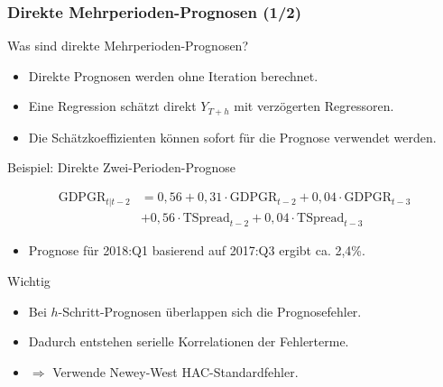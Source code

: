 \documentclass[10pt,aspectratio=169]{beamer}\usepackage[]{graphicx}\usepackage[]{xcolor}
\begin{document}
\begin{frame}
  \frametitle{Direkte Mehrperioden-Prognosen \hfill (1/2)}

  Was sind direkte Mehrperioden-Prognosen?
  
  \begin{itemize}
    \item Direkte Prognosen werden ohne Iteration berechnet.
    \item Eine Regression schätzt direkt $Y_{T+h}$ mit verzögerten Regressoren.
    \item Die Schätzkoeffizienten können sofort für die Prognose verwendet werden.
  \end{itemize}  

  Beispiel: Direkte Zwei-Perioden-Prognose
  
  \vspace{-0.50cm}
  
  \begin{align*}
    \text{GDPGR}_{t|t-2} &= 0{,}56 + 0{,}31 \cdot \text{GDPGR}_{t-2} + 0{,}04 \cdot \text{GDPGR}_{t-3} \\
    &+ 0{,}56 \cdot \text{TSpread}_{t-2} + 0{,}04 \cdot \text{TSpread}_{t-3}
  \end{align*}

  \vspace{-0.25cm}

  \begin{itemize}
    \item Prognose für 2018:Q1 basierend auf 2017:Q3 ergibt ca. 2{,}4\%.
  \end{itemize}

  Wichtig
  
  \begin{itemize}
    \item Bei $h$-Schritt-Prognosen überlappen sich die Prognosefehler.
    \item Dadurch entstehen serielle Korrelationen der Fehlerterme.
    \item $\Rightarrow$ Verwende Newey-West HAC-Standardfehler.
  \end{itemize}  

\end{frame}
\end{document}
